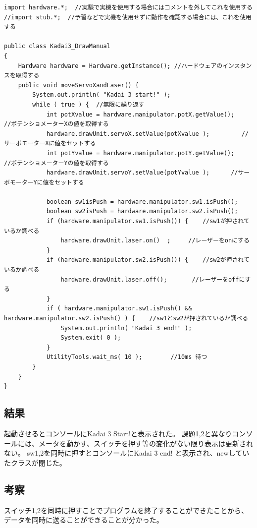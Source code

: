 \documentclass{jarticle}
\begin{document}
\begin{lstlisting}[caption=DrawManual]
import hardware.*;  //実験で実機を使用する場合にはコメントを外してこれを使用する
//import stub.*;  //予習などで実機を使用せずに動作を確認する場合には、これを使用する

public class Kadai3_DrawManual
{
    Hardware hardware = Hardware.getInstance(); //ハードウェアのインスタンスを取得する
    public void moveServoXandLaser() {
        System.out.println( "Kadai 3 start!" );
        while ( true ) {  //無限に繰り返す
            int potXvalue = hardware.manipulator.potX.getValue();        //ポテンショメーターXの値を取得する
            hardware.drawUnit.servoX.setValue(potXvalue );         //サーボモーターXに値をセットする
            int potYvalue = hardware.manipulator.potY.getValue();                  //ポテンショメーターYの値を取得する
            hardware.drawUnit.servoY.setValue(potYvalue );      //サーボモーターYに値をセットする
            
            boolean sw1isPush = hardware.manipulator.sw1.isPush();
            boolean sw2isPush = hardware.manipulator.sw2.isPush();
            if (hardware.manipulator.sw1.isPush()) {    //sw1が押されているか調べる
                hardware.drawUnit.laser.on()  ;     //レーザーをonにする
            }
            if (hardware.manipulator.sw2.isPush()) {    //sw2が押されているか調べる
                hardware.drawUnit.laser.off();       //レーザーをoffにする
            }
            if ( hardware.manipulator.sw1.isPush() && hardware.manipulator.sw2.isPush() ) {    //sw1とsw2が押されているか調べる
                System.out.println( "Kadai 3 end!" );
                System.exit( 0 );
            }
            UtilityTools.wait_ms( 10 );        //10ms 待つ
        }
    }
}
\end{lstlisting}

\subsection{結果}
起動させるとコンソールにKadai 3 Start!と表示された。
課題1,2と異なりコンソールには、メータを動かす、スイッチを押す等の変化がない限り表示は更新されない。
sw1,2を同時に押すとコンソールにKadai 3 end! と表示され、newしていたクラスが閉じた。

\subsection{考察}

スイッチ1,2を同時に押すことでプログラムを終了することができたことから、データを同時に送ることができることが分かった。
\end{document}
